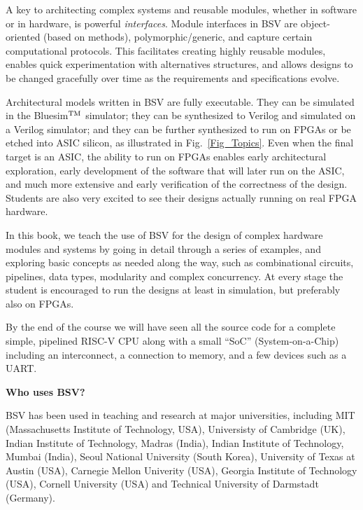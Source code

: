 A key to architecting complex systems and reusable modules, whether in
software or in hardware, is powerful \emph{interfaces}.  Module
interfaces in BSV are object-oriented (based on methods),
polymorphic/generic, and capture certain computational protocols.
This facilitates creating highly reusable modules, enables quick
experimentation with alternatives structures, and allows designs to be
changed gracefully over time as the requirements and specifications
evolve.

Architectural models written in BSV are fully executable.  They can be
simulated in the Bluesim$^{\rm TM}$ simulator; they can be synthesized
to Verilog and simulated on a Verilog simulator; and they can be
further synthesized to run on FPGAs or be etched into ASIC silicon, as
illustrated in Fig.~\ref{Fig_Topics}.  Even when the final target
is an ASIC, the ability to run on FPGAs enables early architectural
exploration, early development of the software that will later run on
the ASIC, and much more extensive and early verification of the
correctness of the design.  Students are also very excited to see
their designs actually running on real FPGA hardware.

In this book, we teach the use of BSV for the design of complex
hardware modules and systems by going in detail through a series of
examples, and exploring basic concepts as needed along the way, such
as combinational circuits, pipelines, data types, modularity and
complex concurrency.  At every stage the student is encouraged to run
the designs at least in simulation, but preferably also on FPGAs.

By the end of the course we will have seen all the source code for a
complete simple, pipelined RISC-V CPU along with a small ``SoC''
(System-on-a-Chip) including an interconnect, a connection to memory,
and a few devices such as a UART.

\hspace{1cm}

{\large\bf Who uses BSV?}

BSV has been used in teaching and research at major universities,
including MIT (Massachusetts Institute of Technology, USA),
Universisty of Cambridge (UK), Indian Institute of Technology, Madras
(India), Indian Institute of Technology, Mumbai (India), Seoul
National University (South Korea), University of Texas at Austin
(USA), Carnegie Mellon Univerity (USA), Georgia Institute of
Technology (USA), Cornell University (USA) and Technical University of
Darmstadt (Germany).


